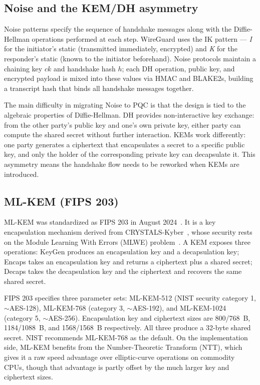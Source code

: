 \documentclass[11pt,a4paper]{article}
\begin{document}
\subsection{Noise and the KEM/DH asymmetry}

Noise patterns specify the sequence of handshake messages along with the Diffie-Hellman operations performed at each step. WireGuard uses the IK pattern --- \emph{I} for the initiator's static (transmitted immediately, encrypted) and \emph{K} for the responder's static (known to the initiator beforehand). Noise protocols maintain a chaining key $\mathit{ck}$ and handshake hash $h$; each DH operation, public key, and encrypted payload is mixed into these values via HMAC and BLAKE2s, building a transcript hash that binds all handshake messages together.

The main difficulty in migrating Noise to PQC is that the design is tied to the algebraic properties of Diffie-Hellman. DH provides non-interactive key exchange: from the other party's public key and one's own private key, either party can compute the shared secret without further interaction. KEMs work differently: one party generates a ciphertext that encapsulates a secret to a specific public key, and only the holder of the corresponding private key can decapsulate it. This asymmetry means the handshake flow needs to be reworked when KEMs are introduced.

\subsection{ML-KEM (FIPS 203)}

ML-KEM was standardized as FIPS 203 in August 2024~\cite{fips203}. It is a key encapsulation mechanism derived from CRYSTALS-Kyber~\cite{bos2018crystals}, whose security rests on the Module Learning With Errors (MLWE) problem~\cite{langlois2015worst}. A KEM exposes three operations: KeyGen produces an encapsulation key and a decapsulation key; Encaps takes an encapsulation key and returns a ciphertext plus a shared secret; Decaps takes the decapsulation key and the ciphertext and recovers the same shared secret.

FIPS 203 specifies three parameter sets: ML-KEM-512 (NIST security category 1, $\sim$AES-128), ML-KEM-768 (category 3, $\sim$AES-192), and ML-KEM-1024 (category 5, $\sim$AES-256). Encapsulation key and ciphertext sizes are 800/768~B, 1184/1088~B, and 1568/1568~B respectively. All three produce a 32-byte shared secret. NIST recommends ML-KEM-768 as the default. On the implementation side, ML-KEM benefits from the Number-Theoretic Transform (NTT), which gives it a raw speed advantage over elliptic-curve operations on commodity CPUs, though that advantage is partly offset by the much larger key and ciphertext sizes.
\end{document}
